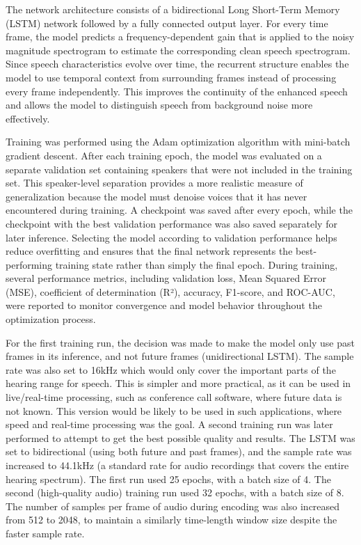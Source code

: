 \documentclass[11pt, letterpaper,titlepage]{article}
\begin{document}
The network architecture consists of a bidirectional Long Short-Term Memory (LSTM) network followed by a fully connected output layer. For every time frame, the model predicts a frequency-dependent gain that is applied to the noisy magnitude spectrogram to estimate the corresponding clean speech spectrogram. Since speech characteristics evolve over time, the recurrent structure enables the model to use temporal context from surrounding frames instead of processing every frame independently. This improves the continuity of the enhanced speech and allows the model to distinguish speech from background noise more effectively.

Training was performed using the Adam optimization algorithm with mini-batch gradient descent. After each training epoch, the model was evaluated on a separate validation set containing speakers that were not included in the training set. This speaker-level separation provides a more realistic measure of generalization because the model must denoise voices that it has never encountered during training. A checkpoint was saved after every epoch, while the checkpoint with the best validation performance was also saved separately for later inference. Selecting the model according to validation performance helps reduce overfitting and ensures that the final network represents the best-performing training state rather than simply the final epoch. During training, several performance metrics, including validation loss, Mean Squared Error (MSE), coefficient of determination (R²), accuracy, F1-score, and ROC-AUC, were reported to monitor convergence and model behavior throughout the optimization process.

For the first training run, the decision was made to make the model only use past frames in its inference, and not future frames (unidirectional LSTM). The sample rate was also set to 16kHz which would only cover the important parts of the hearing range for speech. This is simpler and more practical, as it can be used in live/real-time processing, such as conference call software, where future data is not known. This version would be likely to be used in such applications, where speed and real-time processing was the goal. A second training run was later performed to attempt to get the best possible quality and results. The LSTM was set to bidirectional (using both future and past frames), and the sample rate was increased to 44.1kHz (a standard rate for audio recordings that covers the entire hearing spectrum). The first run used 25 epochs, with a batch size of 4. The second (high-quality audio) training run used 32 epochs, with a batch size of 8. The number of samples per frame of audio during encoding was also increased from 512 to 2048, to maintain a similarly time-length window size despite the faster sample rate.
\end{document}
